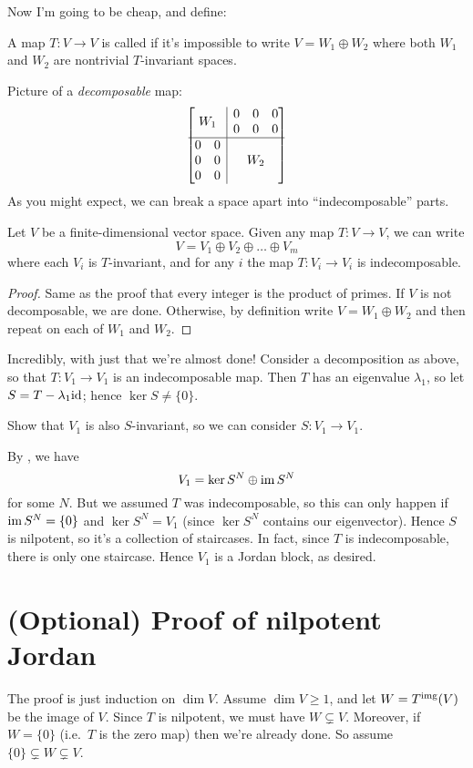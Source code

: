 Now I'm going to be cheap, and define:
\begin{definition}
	A map $T \colon V \to V$ is called 
	if it's impossible to write $V = W_1 \oplus W_2$
	where both $W_1$ and $W_2$ are nontrivial $T$-invariant spaces.
\end{definition}
Picture of a \emph{decomposable} map:
\[
	\begin{bmatrix}
		\multicolumn{2}{c|}{\multirow{2}{*}{$W_1$}} & 0 & 0 & 0  \\
		\multicolumn{2}{c|}{} & 0 & 0 & 0 \\ \hline
		0 & 0 & \multicolumn{3}{|c}{\multirow{3}{*}{$W_2$}} \\
		0 & 0 & \multicolumn{3}{|c}{} \\
		0 & 0 & \multicolumn{3}{|c}{}
	\end{bmatrix}
\]
As you might expect, we can break a space apart into ``indecomposable'' parts.
\begin{proposition}
	Let $V$ be a finite-dimensional vector space.
	Given any map $T \colon V \to V$, we can write
	\[ V = V_1 \oplus V_2 \oplus \dots \oplus V_m \]
	where each $V_i$ is $T$-invariant,
	and for any $i$ the map $T \colon V_i \to V_i$ is indecomposable.
\end{proposition}
\begin{proof}
	Same as the proof that every integer is the product of primes.
	If $V$ is not decomposable, we are done.
	Otherwise, by definition write $V = W_1 \oplus W_2$
	and then repeat on each of $W_1$ and $W_2$.
\end{proof}

Incredibly, with just that we're almost done!
Consider a decomposition as above,
so that $T \colon V_1 \to V_1$ is an indecomposable map.
Then $T$ has an eigenvalue $\lambda_1$, so let $S = T - \lambda_1 \mathrm{id}$; hence $\ker S \neq \{0\}$.
\begin{ques}
	Show that $V_1$ is also $S$-invariant, so we can consider $S : V_1 \to V_1$.
\end{ques}
By , we have
\[ V_1 = \ker S^N \oplus \operatorname{im} S^N \]
for some $N$.
But we assumed $T$ was indecomposable,
so this can only happen if $\operatorname{im} S^N = \{0\}$ and $\ker S^N = V_1$
(since $\ker S^N$ contains our eigenvector).
Hence $S$ is nilpotent, so it's a collection of staircases.
In fact, since $T$ is indecomposable, there is only one staircase.
Hence $V_1$ is a Jordan block, as desired.

\section{(Optional) Proof of nilpotent Jordan}
The proof is just induction on $\dim V$.
Assume $\dim V \ge 1$, and let $W = T^{\text{img}}(V)$ be the image of $V$.
Since $T$ is nilpotent, we must have $W \subsetneq V$.
Moreover, if $W = \{0\}$ (i.e.\ $T$ is the zero map) then we're already done.
So assume $\{0\} \subsetneq W \subsetneq V$.

